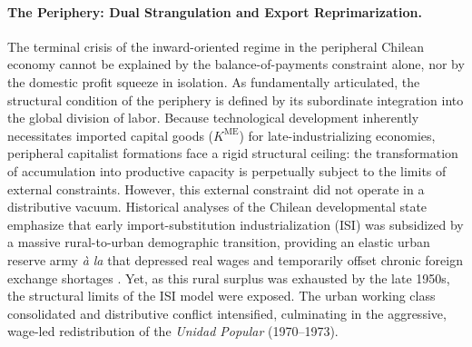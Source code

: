 \paragraph{The Periphery: Dual Strangulation and Export Reprimarization.} 
The terminal crisis of the inward-oriented regime in the peripheral Chilean economy cannot be explained by the balance-of-payments constraint alone, nor by the domestic profit squeeze in isolation. As \citet{Prebisch1981} fundamentally articulated, the structural condition of the periphery is defined by its subordinate integration into the global division of labor. Because technological development inherently necessitates imported capital goods ($K^{\text{ME}}$) for late-industrializing economies, peripheral capitalist formations face a rigid structural ceiling: the transformation of accumulation into productive capacity is perpetually subject to the limits of external constraints. However, this external constraint did not operate in a distributive vacuum. Historical analyses of the Chilean developmental state emphasize that early import-substitution industrialization (ISI) was subsidized by a massive rural-to-urban demographic transition, providing an elastic urban reserve army \textit{\`a la} \citet{Lewis1954} that depressed real wages and temporarily offset chronic foreign exchange shortages \citep{Polanco2021}. Yet, as this rural surplus was exhausted by the late 1950s, the structural limits of the ISI model were exposed. The urban working class consolidated and distributive conflict intensified, culminating in the aggressive, wage-led redistribution of the \textit{Unidad Popular} (1970--1973).

